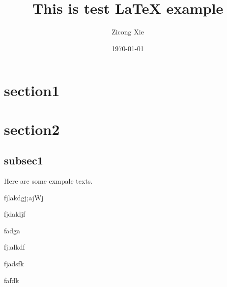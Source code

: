 \documentclass{article}
\title{This is test \LaTeX{} example}
\author{Zicong Xie}
\date{\today}
\begin{document}
  \maketitle

  \section{section1}%
  \label{sec:section1}
  
  \section{section2}%
  \label{sec:section2}
  
  \subsection{subsec1}%
  \label{sub:subsec1}
  
  
  

  Here are some exmpale texts.

  fjlakdgj;ajWj

  fjdakljf


  fadga

  fj;alkdf

  fjadsfk

  fafdk 
\end{document}
